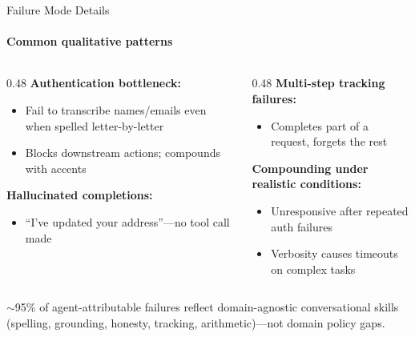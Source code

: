 \documentclass[aspectratio=169]{beamer}
\begin{document}

\begin{frame}{Failure Mode Details}
  \framesubtitle{Common qualitative patterns}

  \begin{columns}[T]
    \begin{column}{0.48\textwidth}
      \textbf{Authentication bottleneck:}
      \begin{itemize}
        \item Fail to transcribe names/emails even when spelled letter-by-letter
        \item Blocks downstream actions; compounds with accents
      \end{itemize}

      \vspace{0.2em}
      \textbf{Hallucinated completions:}
      \begin{itemize}
        \item ``I've updated your address''---no tool call made
      \end{itemize}
    \end{column}
    \begin{column}{0.48\textwidth}
      \textbf{Multi-step tracking failures:}
      \begin{itemize}
        \item Completes part of a request, forgets the rest
      \end{itemize}

      \vspace{0.2em}
      \textbf{Compounding under realistic conditions:}
      \begin{itemize}
        \item Unresponsive after repeated auth failures
        \item Verbosity causes timeouts on complex tasks
      \end{itemize}
    \end{column}
  \end{columns}

  \vspace{0.4em}
  {\footnotesize $\sim$95\% of agent-attributable failures reflect domain-agnostic conversational skills (spelling, grounding, honesty, tracking, arithmetic)---not domain policy gaps.}

\end{frame}
\end{document}
